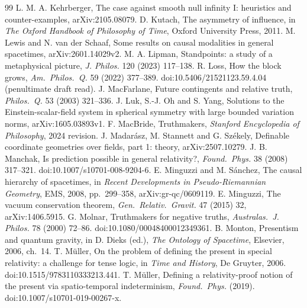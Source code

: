\documentclass[11pt]{article}
\theoremstyle{definition}
\begin{document}
\begin{thebibliography}{99}
 L. M. A. Kehrberger, The case against smooth null infinity I: heuristics and counter-examples, arXiv:2105.08079.
 D. Kutach, The asymmetry of influence, in \emph{The Oxford Handbook of Philosophy of Time}, Oxford University Press, 2011.
 M. Lewis and N. van der Schaaf, Some results on causal modalities in general spacetimes, arXiv:2601.14029v2.
 M. A. Lipman, Standpoints: a study of a metaphysical picture, \emph{J. Philos.} 120 (2023) 117--138.
 R. Loss, How the block grows, \emph{Am.\ Philos.\ Q.} 59 (2022) 377--389. doi:10.5406/21521123.59.4.04 (penultimate draft read).
 J. MacFarlane, Future contingents and relative truth, \emph{Philos.\ Q.} 53 (2003) 321--336.
 J. Luk, S.-J. Oh and S. Yang, Solutions to the Einstein-scalar-field system in spherical symmetry with large bounded variation norms, arXiv:1605.03893v1.
 F. MacBride, Truthmakers, \emph{Stanford Encyclopedia of Philosophy}, 2024 revision.
 J. Madarász, M. Stannett and G. Székely, Definable coordinate geometries over fields, part 1: theory, arXiv:2507.10279.
 J. B. Manchak, Is prediction possible in general relativity?, \emph{Found.\ Phys.} 38 (2008) 317--321. doi:10.1007/s10701-008-9204-6.
 E. Minguzzi and M. Sánchez, The causal hierarchy of spacetimes, in \emph{Recent Developments in Pseudo-Riemannian Geometry}, EMS, 2008, pp.~299--358, arXiv:gr-qc/0609119.
 E. Minguzzi, The vacuum conservation theorem, \emph{Gen.\ Relativ.\ Gravit.} 47 (2015) 32, arXiv:1406.5915.
 G. Molnar, Truthmakers for negative truths, \emph{Australas.\ J. Philos.} 78 (2000) 72--86. doi:10.1080/00048400012349361.
 B. Monton, Presentism and quantum gravity, in D. Dieks (ed.), \emph{The Ontology of Spacetime}, Elsevier, 2006, ch.~14.
 T. Müller, On the problem of defining the present in special relativity: a challenge for tense logic, in \emph{Time and History}, De Gruyter, 2006. doi:10.1515/9783110333213.441.
 T. Müller, Defining a relativity-proof notion of the present via spatio-temporal indeterminism, \emph{Found.\ Phys.} (2019). doi:10.1007/s10701-019-00267-x.

\end{thebibliography}
\end{document}
